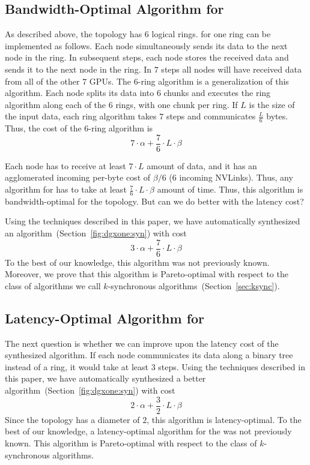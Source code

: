 \subsection{Bandwidth-Optimal Algorithm for \dgxone}
\label{sec:motivation:bw-optimal}
As described above, the \dgxone topology has $6$ logical rings. \allgather for one ring can be implemented as follows. Each node simultaneously sends its data to the next node in the ring. In subsequent steps, each node stores the received data and sends it to the next node in the ring. In $7$ steps all nodes will have received data from all of the other $7$ GPUs. The $6$-ring algorithm is a generalization of this algorithm. Each node splits its data into $6$ chunks and executes the ring algorithm along each of the $6$ rings, with one chunk per ring. If $L$ is the size of the input data, each ring algorithm takes $7$ steps and communicates $\frac{L}{6}$ bytes. Thus, the cost of the $6$-ring algorithm is  
$$7\cdot \alpha + \frac{7}{6}\cdot L \cdot \beta$$

Each node has to receive at least $7 \cdot L$ amount of data, and it has an agglomerated incoming per-byte cost of $\beta/6$ (6 incoming NVLinks). Thus, any algorithm for \allgather has to take at least $\frac{7}{6}\cdot L \cdot \beta$ amount of time. Thus, this algorithm is bandwidth-optimal for the \dgxone topology. But can we do better with the latency cost? 

Using the techniques described in this paper, we have automatically synthesized an algorithm~(Section~\ref{fig:dgxone:syn}) with cost $$3\cdot \alpha + \frac{7}{6}\cdot L \cdot \beta$$ To the best of our knowledge, this algorithm was not previously known. Moreover, we prove that this algorithm is Pareto-optimal with respect to the class of algorithms we call $k$-synchronous algorithms~(Section~\ref{sec:ksync}).  

\subsection{Latency-Optimal Algorithm for \dgxone}
The next question is whether we can improve upon the latency cost of the synthesized algorithm. If each node communicates its data along a binary tree instead of a ring, it would take at least $3$ steps. Using the techniques described in this paper, we have automatically synthesized a better algorithm~(Section~\ref{fig:dgxone:syn}) with cost $$2\cdot \alpha + \frac{3}{2}\cdot L \cdot \beta$$
Since the \dgxone topology has a diameter of $2$, this algorithm is latency-optimal. To the best of our knowledge, a latency-optimal algorithm for the \dgxone was not previously known. This algorithm is Pareto-optimal with respect to the class of $k$-synchronous algorithms.  


